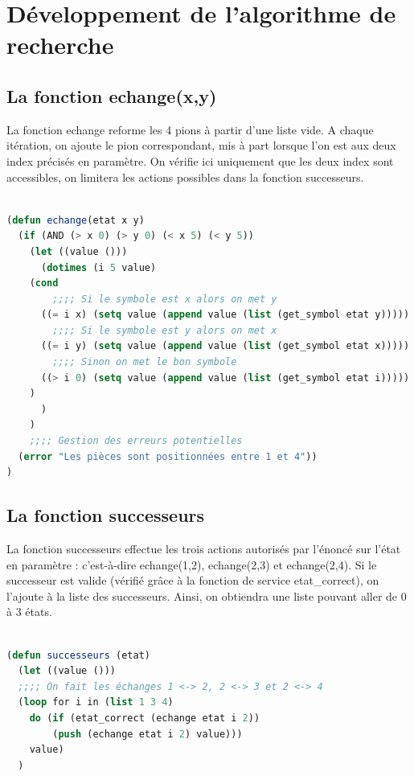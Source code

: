 \documentclass[a4paper,10pt]{report}
\begin{document}
\chapter{Développement de l'algorithme de recherche}

  \section{La fonction echange(x,y)}
  La fonction echange reforme les 4 pions à partir d’une liste vide. A chaque itération, on ajoute le pion correspondant, mis à part lorsque l’on est aux deux index précisés en paramètre.  On vérifie ici uniquement que les deux index sont accessibles, on limitera les actions possibles dans la fonction successeurs.
  
  \begin{lstlisting}[language=Lisp]
   
(defun echange(etat x y)
  (if (AND (> x 0) (> y 0) (< x 5) (< y 5))
    (let ((value ()))
      (dotimes (i 5 value)
	(cond
	    ;;;; Si le symbole est x alors on met y
	  ((= i x) (setq value (append value (list (get_symbol etat y)))))
	    ;;;; Si le symbole est y alors on met x
	  ((= i y) (setq value (append value (list (get_symbol etat x))))) 
	    ;;;; Sinon on met le bon symbole
	  ((> i 0) (setq value (append value (list (get_symbol etat i)))))
	)
      )
    )
    ;;;; Gestion des erreurs potentielles
  (error "Les pièces sont positionnées entre 1 et 4")) 
)

  \end{lstlisting}
\newpage
  \section{La fonction successeurs}
  La fonction successeurs effectue les trois actions autorisés par l’énoncé sur l’état en paramètre : c’est-à-dire echange(1,2), echange(2,3) et echange(2,4). Si le successeur est valide (vérifié grâce à la fonction de service etat\_correct), on l’ajoute à la liste des successeurs. Ainsi, on obtiendra une liste pouvant aller de 0 à 3 états.
  \begin{lstlisting}[language=Lisp]
   
(defun successeurs (etat)
  (let ((value ()))
  ;;;; On fait les échanges 1 <-> 2, 2 <-> 3 et 2 <-> 4
  (loop for i in (list 1 3 4) 
    do (if (etat_correct (echange etat i 2))
	    (push (echange etat i 2) value)))
	value)
  )

  \end{lstlisting}
  
\end{document}
